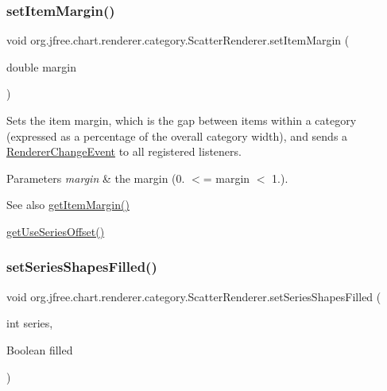 \subsubsection{\texorpdfstring{set\+Item\+Margin()}{setItemMargin()}}
{\footnotesize\ttfamily void org.\+jfree.\+chart.\+renderer.\+category.\+Scatter\+Renderer.\+set\+Item\+Margin (\begin{DoxyParamCaption}\item[{double}]{margin }\end{DoxyParamCaption})}

Sets the item margin, which is the gap between items within a category (expressed as a percentage of the overall category width), and sends a \mbox{\hyperlink{}{Renderer\+Change\+Event}} to all registered listeners.


\begin{DoxyParams}{Parameters}
{\em margin} & the margin (0. $<$= margin $<$ 1.).\\
\hline
\end{DoxyParams}
\begin{DoxySeeAlso}{See also}
\mbox{\hyperlink{classorg_1_1jfree_1_1chart_1_1renderer_1_1category_1_1_scatter_renderer_a04492c88e6bffca4048e638d89d6ef6d}{get\+Item\+Margin()}} 

\mbox{\hyperlink{classorg_1_1jfree_1_1chart_1_1renderer_1_1category_1_1_scatter_renderer_a7ec61a84fcdf7910f9459b2e88261249}{get\+Use\+Series\+Offset()}} 
\end{DoxySeeAlso}
\mbox{\label{classorg_1_1jfree_1_1chart_1_1renderer_1_1category_1_1_scatter_renderer_ae2624911a43792603488f73d1171c2ab}} 
\subsubsection{\texorpdfstring{set\+Series\+Shapes\+Filled()}{setSeriesShapesFilled()}\hspace{0.1cm}{\footnotesize\ttfamily [1/2]}}
{\footnotesize\ttfamily void org.\+jfree.\+chart.\+renderer.\+category.\+Scatter\+Renderer.\+set\+Series\+Shapes\+Filled (\begin{DoxyParamCaption}\item[{int}]{series,  }\item[{Boolean}]{filled }\end{DoxyParamCaption})}

